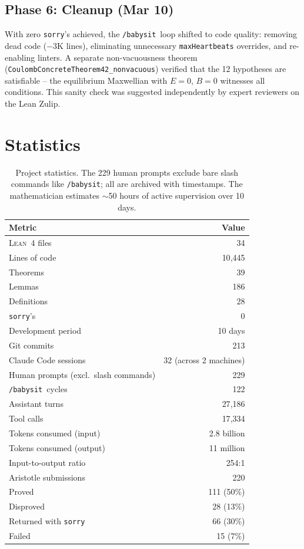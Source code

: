 \documentclass[11pt]{article}
\newcommand{\lean}{\textsc{Lean}}
\newcommand{\sorry}{\texttt{sorry}}
\newcommand{\babysit}{\texttt{/babysit}}
\begin{document}
\subsection{Phase 6: Cleanup (Mar 10)}

With zero \sorry's achieved, the \babysit\ loop shifted to code quality: removing dead code ($-3$K lines), eliminating unnecessary \texttt{maxHeartbeats} overrides, and re-enabling linters. A separate non-vacuousness theorem (\texttt{CoulombConcreteTheorem42\_nonvacuous}) verified that the 12 hypotheses are satisfiable -- the equilibrium Maxwellian with $E = 0$, $B = 0$ witnesses all conditions. This sanity check was suggested independently by expert reviewers on the Lean Zulip.

\section{Statistics}
\label{sec:stats}

\begin{table}[t]
\centering
\begin{tabular}{@{}lr@{}}
\toprule
Metric & Value \\
\midrule
\lean~4 files & 34 \\
Lines of code & 10{,}445 \\
Theorems & 39 \\
Lemmas & 186 \\
Definitions & 28 \\
\sorry's & 0 \\
Development period & 10 days \\
Git commits & 213 \\
Claude Code sessions & 32 (across 2 machines) \\
Human prompts (excl.\ slash commands) & 229 \\
\babysit\ cycles & 122 \\
Assistant turns & 27{,}186 \\
Tool calls & 17{,}334 \\
Tokens consumed (input) & 2.8 billion \\
Tokens consumed (output) & 11 million \\
Input-to-output ratio & 254:1 \\
Aristotle submissions & 220 \\
\quad Proved & 111 (50\%) \\
\quad Disproved & 28 (13\%) \\
\quad Returned with \sorry & 66 (30\%) \\
\quad Failed & 15 (7\%) \\
\bottomrule
\end{tabular}
\caption{Project statistics. The 229 human prompts exclude bare slash commands like \babysit; all are archived with timestamps. The mathematician estimates $\sim$50 hours of active supervision over 10 days.}
\label{tab:stats}
\end{table}
\end{document}
